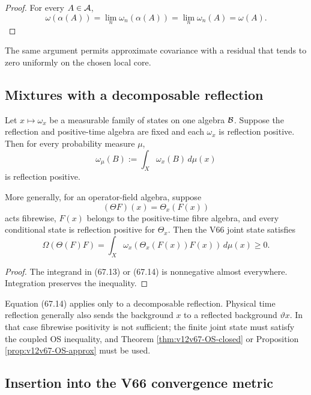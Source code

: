 \documentclass[11pt]{article}
\theoremstyle{remark}
\begin{document}
\begin{proof}
For every \(A\in{\cal A}\),
\[
 \omega(\alpha(A))
 =
 \lim_n\omega_n(\alpha(A))
 =
 \lim_n\omega_n(A)
 =
 \omega(A).
\]
\end{proof}

The same argument permits approximate covariance with a residual
that tends to zero uniformly on the chosen local core.

\subsection{Mixtures with a decomposable reflection}

Let \(x\mapsto\omega_x\) be a measurable family of states on one
algebra \({\cal B}\).  Suppose the reflection and positive-time
algebra are fixed and each \(\omega_x\) is reflection positive.
Then for every probability measure \(\mu\),
\begin{equation}
                         \omega_\mu(B)
 :=
 \int_X\omega_x(B)\,d\mu(x)                       \tag{67.13}
\end{equation}
is reflection positive.

More generally, for an operator-field algebra, suppose
\[
 (\Theta F)(x)=\Theta_x(F(x))
\]
acts fibrewise, \(F(x)\) belongs to the positive-time fibre algebra,
and every conditional state is reflection positive for
\(\Theta_x\).  Then the V66 joint state satisfies
\begin{equation}
 \Omega(\Theta(F)F)
 =
 \int_X
 \omega_x(\Theta_x(F(x))F(x))\,d\mu(x)\geq0.       \tag{67.14}
\end{equation}

\begin{proof}
The integrand in (67.13) or (67.14) is nonnegative almost
everywhere.  Integration preserves the inequality.
\end{proof}

Equation (67.14) applies only to a decomposable reflection.  Physical
time reflection generally also sends the background
\(x\) to a reflected background \(\vartheta x\).  In that case
fibrewise positivity is not sufficient; the finite joint state must
satisfy the coupled OS inequality, and Theorem
\ref{thm:v12v67-OS-closed} or Proposition
\ref{prop:v12v67-OS-approx} must be used.

\subsection{Insertion into the V66 convergence metric}
\end{document}
